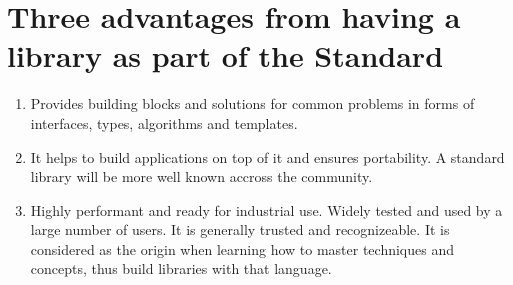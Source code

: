 \documentclass{article}
\begin{document}
 \section*{Three advantages from having a library as part of the Standard}
 \begin{enumerate}
  \item Provides building blocks and solutions for common problems in forms of interfaces, types, algorithms and templates.
  \item It helps to build applications on top of it and ensures portability. A standard library will be more well known accross the community.
  \item Highly performant and ready for industrial use. Widely tested and used by a large number of users. It is generally trusted and recognizeable.
  It is considered as the origin when learning how to master techniques and concepts, thus build libraries with that language.
 \end{enumerate}
\end{document}
